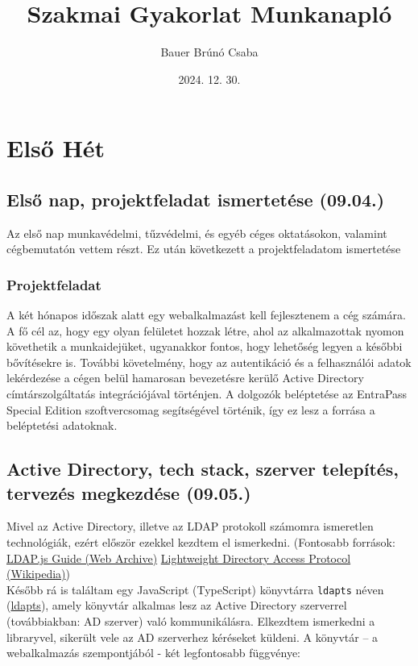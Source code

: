 \documentclass[a4paper]{article}
\title{Szakmai Gyakorlat Munkanapló}
\author{Bauer Brúnó Csaba}
\date{2024. 12. 30.}
\newcommand{\inlts}[1]{\texttt{#1}}
\begin{document}
\maketitle

\tableofcontents

\section{Első Hét}

\subsection{Első nap, projektfeladat ismertetése (09.04.)}

Az első nap munkavédelmi, tűzvédelmi, és egyéb céges oktatásokon, valamint cégbemutatón vettem
részt. Ez után következett a projektfeladatom ismertetése

\subsubsection*{Projektfeladat}

A két hónapos időszak alatt egy webalkalmazást kell fejlesztenem a cég számára. A fő cél az, hogy egy
olyan felületet hozzak létre, ahol az alkalmazottak nyomon követhetik a munkaidejüket, ugyanakkor
fontos, hogy lehetőség legyen a későbbi bővítésekre is. További követelmény, hogy az autentikáció és
a felhasználói adatok lekérdezése a cégen belül hamarosan bevezetésre kerülő Active Directory
címtárszolgáltatás integrációjával történjen. A dolgozók beléptetése az EntraPass Special Edition
szoftvercsomag segítségével történik, így ez lesz a forrása a beléptetési adatoknak.

\subsection{Active Directory, tech stack, szerver telepítés, tervezés megkezdése (09.05.)}

Mivel az Active Directory, illetve az LDAP protokoll számomra ismeretlen technológiák, ezért először
ezekkel kezdtem el ismerkedni. (Fontosabb források:
\href{http://web.archive.org/web/20240315064825/http://ldapjs.org/guide.html}{LDAP.js Guide (Web Archive)}
\href{https://en.wikipedia.org/wiki/Lightweight_Directory_Access_Protocol}{Lightweight Directory Access Protocol (Wikipedia)})\\

Később rá is találtam egy JavaScript (TypeScript) könyvtárra \inlts{ldapts} néven
(\href{https://github.com/ldapts/ldapts}{ldapts}), amely könyvtár alkalmas lesz az Active Directory szerverrel
(továbbiakban: AD szerver) való kommunikálásra. Elkezdtem ismerkedni a libraryvel, sikerült vele az
AD szerverhez kéréseket küldeni. A könyvtár – a webalkalmazás szempontjából - két legfontosabb
függvénye:
\end{document}
